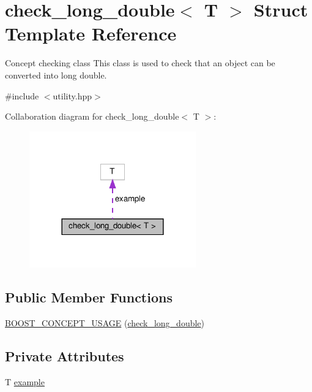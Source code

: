 \hypertarget{structcheck__long__double}{}\section{check\+\_\+long\+\_\+double$<$ T $>$ Struct Template Reference}
\label{structcheck__long__double}


Concept checking class This class is used to check that an object can be converted into long double.  




{\ttfamily \#include $<$utility.\+hpp$>$}



Collaboration diagram for check\+\_\+long\+\_\+double$<$ T $>$\+:
\nopagebreak
\begin{figure}[H]
\begin{center}
\leavevmode
\includegraphics[width=204pt]{df/df8/structcheck__long__double__coll__graph}
\end{center}
\end{figure}
\subsection*{Public Member Functions}
\begin{DoxyCompactItemize}
\item 
\hyperlink{structcheck__long__double_a4b9f82b6744a7c2dcc8e0380d2815a47}{B\+O\+O\+S\+T\+\_\+\+C\+O\+N\+C\+E\+P\+T\+\_\+\+U\+S\+A\+GE} (\hyperlink{structcheck__long__double}{check\+\_\+long\+\_\+double})
\end{DoxyCompactItemize}
\subsection*{Private Attributes}
\begin{DoxyCompactItemize}
\item 
T \hyperlink{structcheck__long__double_a50d75a67431fd1169e6040354950c662}{example}
\end{DoxyCompactItemize}


